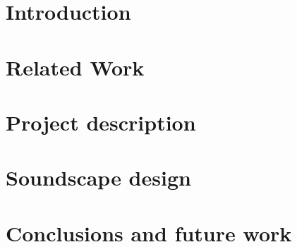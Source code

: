 \section{Introduction}


\section{Related Work}


\section{Project description}


\section{Soundscape design}



\section{Conclusions and future work}